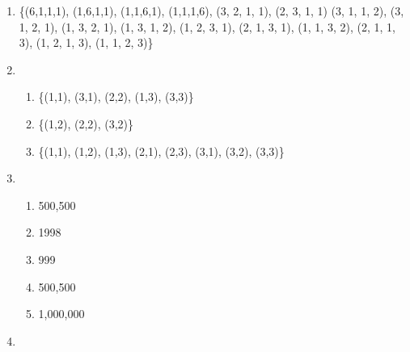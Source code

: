 \documentclass[11pt]{article}
\begin{document}
\begin{enumerate}
\begin{proof}
    \end{proof}
    \item \{(6,1,1,1), (1,6,1,1), (1,1,6,1), (1,1,1,6), (3, 2, 1, 1), (2, 3, 1, 1)
    (3, 1, 1, 2), (3, 1, 2, 1), (1, 3, 2, 1), (1, 3, 1, 2), (1, 2, 3, 1),
    (2, 1, 3, 1), (1, 1, 3, 2), (2, 1, 1, 3), (1, 2, 1, 3), (1, 1, 2, 3)\}
    \item \begin{enumerate}
        \item \{(1,1), (3,1), (2,2), (1,3), (3,3)\}
        \item \{(1,2), (2,2), (3,2)\}
        \item \{(1,1), (1,2), (1,3), (2,1), (2,3), (3,1), (3,2), (3,3)\}
    \end{enumerate}
    \item \begin{enumerate}
        \item 500,500
        \item 1998
        \item 999
        \item 500,500
        \item 1,000,000
    \end{enumerate}
    \item {}
\end{enumerate}
\end{document}
